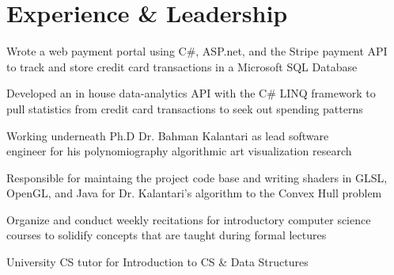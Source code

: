 \documentclass[]{deedy-resume-openfont}
\begin{document}
\hfill
\begin{minipage}[t]{0.66\textwidth} 


\section{Experience \& Leadership}

\vspace{\topsep} 
\begin{tightemize}
\item Wrote a web payment portal using C\#, ASP.net, and the Stripe payment API \\to track and store credit card transactions in a Microsoft SQL Database
\item Developed an in house data-analytics API with the C\# LINQ framework to \\pull statistics from credit card transactions to seek out spending patterns
\end{tightemize}
\sectionsep

\begin{tightemize}
\item Working underneath Ph.D Dr. Bahman Kalantari as lead software \\engineer for his polynomiography algorithmic art visualization research 
\item Responsible for maintaing the project code base and writing shaders in GLSL, OpenGL, and Java for Dr. Kalantari's algorithm to the Convex Hull problem
\end{tightemize}
\sectionsep

\begin{tightemize}
\item Organize and conduct weekly recitations for introductory computer science courses to solidify concepts that are taught during formal lectures
\item University CS tutor for Introduction to CS  \& Data Structures 
\end{tightemize}
\sectionsep


\end{minipage}
\end{document}
